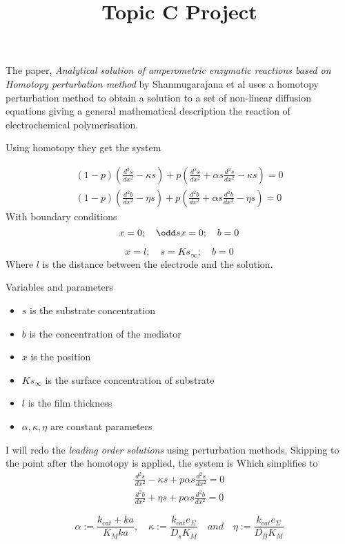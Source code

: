 \documentclass{X:/Documents/Coding/Latex/myassignment}
\title{Topic C Project}
\begin{document}
\maketitle

The paper, \textit{Analytical solution of amperometric enzymatic reactions based on
Homotopy perturbation method} by Shanmugarajana et al uses a homotopy perturbation method to obtain a solution to a set of non-linear diffusion equations giving a general mathematical description the reaction of electrochemical polymerisation.

Using homotopy they get the system

\begin{align*}
	(1-p)\left(\frac{d^2s}{dx^2} - \kappa s\right) + p \left(\frac{d^2s}{dx^2} + \alpha s \frac{d^2s}{dx^2} - \kappa s\right) = 0\\
	(1-p)\left(\frac{d^2b}{dx^2} - \eta s\right) + p \left(\frac{d^2b}{dx^2} + \alpha s \frac{d^2b}{dx^2} - \eta s\right) = 0
\end{align*}
With boundary conditions 
\[x=0 ; \quad \odd sx = 0; \quad b=0\]

\[x=l ; \quad s = Ks_{\infty}; \quad b=0\]
Where $l$ is the distance between the electrode and the solution.

Variables and parameters
\begin{itemize}
	\item $s$ is the substrate concentration
	\item $b$ is the concentration of the mediator
	\item $x$ is the position
	\item $Ks_{\infty}$ is the surface concentration of substrate
	\item $l$ is the film thickness
	\item $\alpha,\kappa,\eta$ are constant parameters
\end{itemize}

I will redo the \textit{leading order solutions} using perturbation methods. Skipping to the point after the homotopy is applied, the system is
Which simplifies to
\begin{align*}
	\frac{d^2s}{dx^2} - \kappa s + p \alpha s \frac{d^2s}{dx^2} = 0\\
	\frac{d^2b}{dx^2} + \eta s + p \alpha s \frac{d^2b}{dx^2} = 0
\end{align*}

\[
\alpha := \frac{k_{cat} + ka}{K_Mka},\quad \kappa := \frac{k_{cat} e_{\Sigma}}{D_sK_M} \quad and \quad \eta := \frac{k_{cat}e_{\Sigma}}{D_BK_M}
\]
\end{document}
